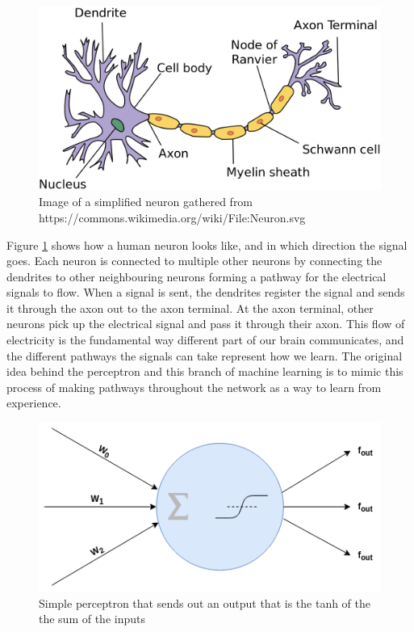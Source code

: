 \begin{figure}[h]
        \centering
        \includegraphics[scale=0.3]{background/figures/neuron.png}
        \caption{Image of a simplified neuron gathered from https://commons.wikimedia.org/wiki/File:Neuron.svg}
        \label{fig:neuron}
\end{figure}


Figure \ref{fig:neuron} shows how a human neuron looks like, and in which direction the signal goes. Each neuron is connected to multiple other neurons by connecting the dendrites to other neighbouring neurons forming a pathway for the electrical signals to flow. 
When a signal is sent, the dendrites register the signal and sends it through the axon out to the axon terminal. At the axon terminal, other neurons pick up the electrical signal and pass it through their axon.
This flow of electricity is the fundamental way different part of our brain communicates, and the different pathways the signals can take represent how we learn. The original idea behind the perceptron and this branch of machine learning is to mimic this process of making pathways throughout the network as a way to learn from experience.


\begin{figure}
        \centering
        \includegraphics[scale=0.7]{background/figures/perceptron.png}
        \caption{Simple perceptron that sends out an output that is the tanh of the the sum of the inputs}
    \label{fig:perceptron}
\end{figure}




